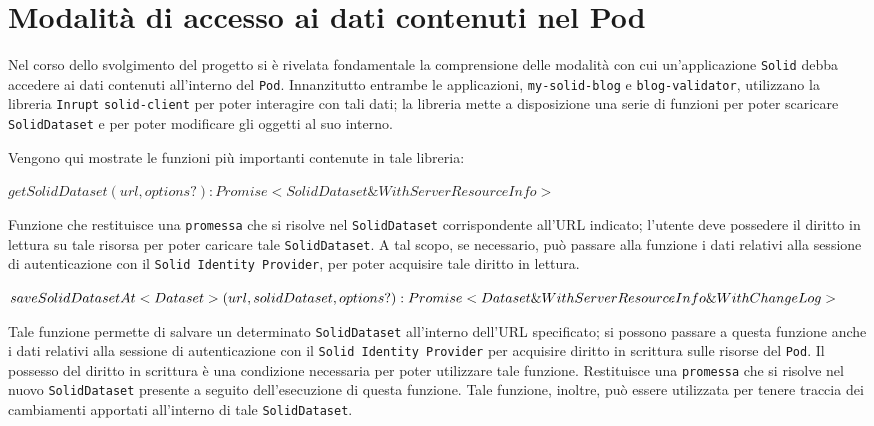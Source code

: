\section{Modalità di accesso ai dati contenuti nel Pod}

\medskip

Nel corso dello svolgimento del progetto si è rivelata fondamentale la comprensione delle modalità con cui un'applicazione {\tt Solid} debba accedere ai dati contenuti all'interno del {\tt Pod}. Innanzitutto entrambe le applicazioni, {\tt my-solid-blog} e {\tt blog-validator}, utilizzano la libreria {\tt Inrupt} {\tt solid-client} per poter interagire con tali dati; la libreria mette a disposizione una serie di funzioni per poter scaricare {\tt SolidDataset} e per poter modificare gli oggetti al suo interno. 

\bigskip

Vengono qui mostrate le funzioni più importanti contenute in tale libreria:

\bigskip
\medskip

$getSolidDataset(url, options?): Promise<SolidDataset \& WithServerResourceInfo>$

\bigskip

Funzione che restituisce una {\tt promessa} che si risolve nel {\tt SolidDataset} corrispondente all'URL indicato; l'utente deve possedere il diritto in lettura su tale risorsa per poter caricare tale {\tt SolidDataset}. A tal scopo, se necessario, può passare alla funzione i dati relativi alla sessione di autenticazione con il {\tt Solid Identity Provider}, per poter acquisire tale diritto in lettura.

\bigskip
\medskip

$saveSolidDatasetAt<Dataset>(url, solidDataset, options?): Promise<Dataset\\ \& WithServerResourceInfo \& WithChangeLog>$

\bigskip

Tale funzione permette di salvare un determinato {\tt SolidDataset} all'interno dell'URL specificato; si possono passare a questa funzione anche i dati relativi alla sessione di autenticazione con il {\tt Solid Identity Provider} per acquisire diritto in scrittura sulle risorse del {\tt Pod}. Il possesso del diritto in scrittura è una condizione necessaria per poter utilizzare tale funzione. Restituisce una {\tt promessa} che si risolve nel nuovo {\tt SolidDataset} presente a seguito dell'esecuzione di questa funzione. Tale funzione, inoltre, può essere utilizzata per tenere traccia dei cambiamenti apportati all'interno di tale {\tt SolidDataset}.

